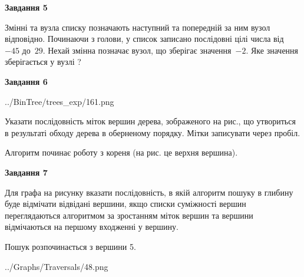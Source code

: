 \documentclass[12pt, ukrainian]{article}
\begin{document}
{\begin {large}
{\begin {center}\textbf{Завдання 5}\end {center}}\par
Змінні  та  вузла списку позначають наступний та попередній за ним вузол відповідно. Починаючи з голови, у список записано послідовні цілі числа від~$-45$ до~$29$. Нехай змінна  позначає вузол, що зберігає значення~$-2$.
Яке значення зберігається у вузлі  ?\par
\newpage

{\begin {center}\textbf{Завдання 6}\end {center}}\par

\begin{center}
	{../BinTree/trees_exp/161.png}
\end{center}
Указати послідовність міток вершин дерева, зображеного на рис., що утвориться в результаті обходу дерева в оберненому порядку. Мітки записувати через пробіл.\par Алгоритм починає роботу з кореня (на рис. це верхня вершина).\par
\newpage

{\begin {center}\textbf{Завдання 7}\end {center}}\par
Для графа на рисунку вказати послідовність, в якій алгоритм пошуку в глибину буде відмічати відвідані вершини, якщо списки суміжності вершин переглядаються алгоритмом за зростанням міток вершин та вершини відмічаються на першому вход\-женні у вершину.\par
Пошук розпочинається з вершини 5.\par

\begin{center}
	{../Graphs/Traversals/48.png}
\end{center}\par
\newpage


\end{large}}
\end{document}
